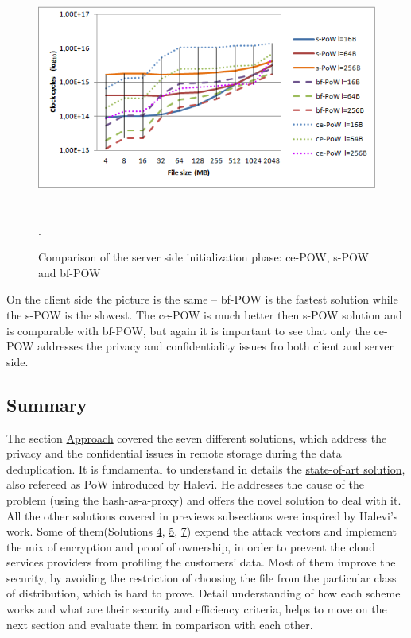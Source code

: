 \documentclass[12pt]{article}
\begin{document}
\begin{figure}[ht] 
\begin{center}
\includegraphics[height=210pt,width=400pt]{ce-POW}
\caption{Comparison of the server side initialization phase: ce-POW, s-POW and bf-POW \cite{ce-POW}}
\label{fig:ce-POW} .
\end{center}
\end{figure}

On the client side the picture is the same -- bf-POW is the fastest solution while the s-POW is the slowest. The ce-POW is much better then s-POW solution and is comparable with bf-POW, but again it is important to see that only the ce-POW addresses the privacy and confidentiality issues fro both client and server side.


\subsection{Summary}
\label{subsub:ApproachSummary}

The section \hyperref[sec:4]{Approach} covered the seven different solutions, which address the privacy and the confidential issues in remote storage during the data deduplication. It is fundamental to understand in details  the \hyperref[sub:Soltuion1]{state-of-art solution}, also refereed as PoW introduced by Halevi. He addresses the cause of the problem (using the hash-as-a-proxy) and offers the novel solution to deal with it. All the other solutions covered in previews subsections were inspired by Halevi's work. Some of them(Solutions \hyperref[sub:Soltuion4]{4}, \hyperref[sub:Soltuion4]{5}, \hyperref[sub:Soltuion4]{7}) expend the  attack vectors and implement the mix of encryption and proof of ownership, in order to prevent the cloud services providers from profiling the customers' data. Most of them improve the security, by avoiding the restriction of choosing the file from the particular class of distribution, which is hard to prove. Detail understanding of how each scheme works and what are their security and efficiency criteria, helps to move on the next section and evaluate them in comparison with each other.  
\end{document}
